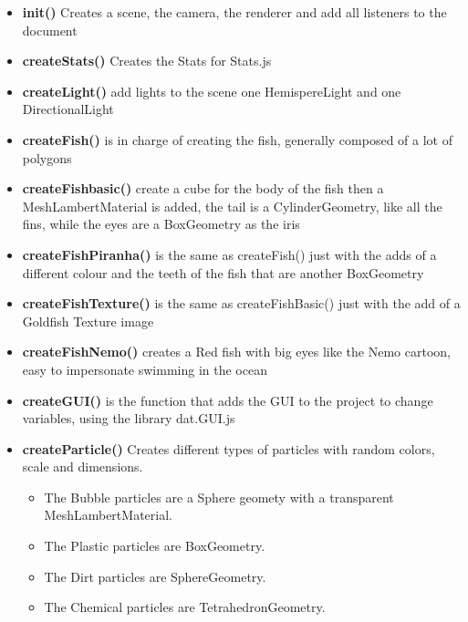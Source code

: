 \documentclass[a4paper,10pt]{article}
\begin{document}
\begin{itemize}
 \item {\bf init()} Creates a scene, the camera, the renderer and add all listeners to the document
 \item {\bf createStats()} Creates the Stats for Stats.js
 \item {\bf createLight()} add lights to the scene one HemispereLight and one DirectionalLight
 \item {\bf createFish()} is in charge of creating the fish, generally composed of a lot of polygons
 \item {\bf createFishbasic()} create a cube for the body of the fish then a MeshLambertMaterial is added, the tail is a CylinderGeometry, like all the fins, while the eyes are a BoxGeometry as the iris
 \item {\bf createFishPiranha()} is the same as createFish() just with the adds of a different colour and the teeth of the fish that are another BoxGeometry
 \item {\bf createFishTexture()} is the same as createFishBasic() just with the add of a Goldfish Texture image
 \item {\bf createFishNemo()} creates a Red fish with big eyes like the Nemo cartoon, easy to impersonate swimming in the ocean
 \item {\bf createGUI()} is the function that adds the GUI to the project to change variables, using the library dat.GUI.js
 \item {\bf createParticle()} Creates different types of particles with random colors, scale and dimensions.
 \begin{itemize}
 \item The Bubble particles are a Sphere geomety with a transparent MeshLambertMaterial.
 \item The Plastic particles are BoxGeometry.
 \item The Dirt particles are SphereGeometry.
 \item The Chemical particles are TetrahedronGeometry.
 \end{itemize}
\end{itemize}
\end{document}
